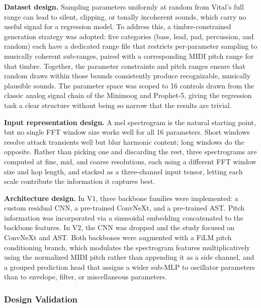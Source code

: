 \noindent \textbf{Dataset design.} Sampling parameters uniformly at random from Vital's full range can lead to silent, clipping, or tonally incoherent sounds, which carry no useful signal for a regression model. To address this, a timbre-constrained generation strategy was adopted: five categories (bass, lead, pad, percussion, and random) each have a dedicated range file that restricts per-parameter sampling to musically coherent sub-ranges, paired with a corresponding MIDI pitch range for that timbre. Together, the parameter constraints and pitch ranges ensure that random draws within those bounds consistently produce recognizable, musically plausible sounds. The parameter space was scoped to 16 controls drawn from the classic analog signal chain of the Minimoog and Prophet-5, giving the regression task a clear structure without being so narrow that the results are trivial.

\par \vspace{0.3cm}
\noindent \textbf{Input representation design.} A mel spectrogram is the natural starting point, but no single FFT window size works well for all 16 parameters. Short windows resolve attack transients well but blur harmonic content; long windows do the opposite. Rather than picking one and discarding the rest, three spectrograms are computed at fine, mid, and coarse resolutions, each using a different FFT window size and hop length, and stacked as a three-channel input tensor, letting each scale contribute the information it captures best.

\par \vspace{0.3cm}
\noindent \textbf{Architecture design.} In V1, three backbone families were implemented: a custom residual CNN, a pre-trained ConvNeXt, and a pre-trained AST. Pitch information was incorporated via a sinusoidal embedding concatenated to the backbone features. In V2, the CNN was dropped and the study focused on ConvNeXt and AST. Both backbones were augmented with a FiLM pitch conditioning branch, which modulates the spectrogram features multiplicatively using the normalized MIDI pitch rather than appending it as a side channel, and a grouped prediction head that assigns a wider sub-MLP to oscillator parameters than to envelope, filter, or miscellaneous parameters.

\subsubsection{Design Validation}

